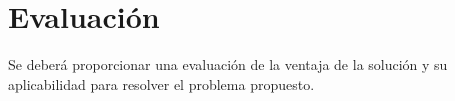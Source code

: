 \section{Evaluación}

Se deberá proporcionar una evaluación de la ventaja de la solución y su aplicabilidad para resolver el problema propuesto.